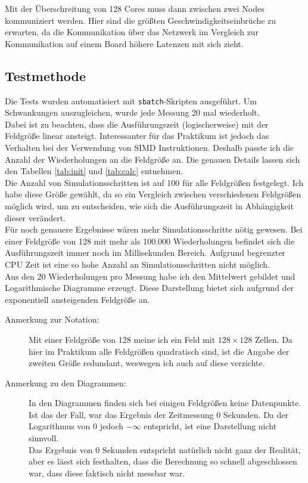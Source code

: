 \documentclass[german,plainarticle,hyperref,utf8]{zihpub}
\begin{document}
	Mit der Überschreitung von 128 Cores muss dann zwischen zwei Nodes kommuniziert werden. Hier sind die größten Geschwindigkeitseinbrüche zu erwarten, da die Kommunikation über das Netzwerk im Vergleich zur Kommunikation auf einem Board höhere Latenzen mit sich zieht.
	\subsection{Testmethode}
	Die Tests wurden automatisiert mit \texttt{sbatch}-Skripten ausgeführt. Um Schwankungen auszugleichen, wurde jede Messung 20 mal wiederholt.\\
	Dabei ist zu beachten, dass die Ausführungszeit (logischerweise) mit der Feldgröße linear ansteigt. Interessanter für das Praktikum ist jedoch das Verhalten bei der Verwendung von SIMD Instruktionen. Deshalb passte ich die Anzahl der Wiederholungen an die Feldgröße an. Die genauen Details lassen sich den Tabellen \ref{tab:init} und \ref{tab:calc} entnehmen.\\
	Die Anzahl von Simulationsschritten ist auf 100 für alle Feldgrößen festgelegt. Ich habe diese Größe gewählt, da so ein Vergleich zwischen verschiedenen Feldgrößen möglich wird, um zu entscheiden, wie sich die Ausführungszeit in Abhängigkeit dieser verändert.\\
	Für noch genauere Ergebnisse wären mehr Simulationsschritte nötig gewesen. Bei einer Feldgröße von 128 mit mehr als 100.000 Wiederholungen befindet sich die Ausführungszeit immer noch im Millisekunden Bereich. Aufgrund begrenzter CPU Zeit ist eine so hohe Anzahl an Simulationsschritten nicht möglich.\\
	
	Aus den 20 Wiederholungen pro Messung habe ich den Mittelwert gebildet und Logarithmische Diagramme erzeugt. Diese Darstellung bietet sich aufgrund der exponentiell ansteigenden Feldgröße an.\\
	
	\begin{description}
		\item[Anmerkung zur Notation:] Mit einer Feldgröße von 128 meine ich ein Feld mit $128\times 128$ Zellen. Da hier im Praktikum alle Feldgrößen quadratisch sind, ist die Angabe der zweiten Größe redundant, weswegen ich auch auf diese verzichte.
		\item[Anmerkung zu den Diagrammen:] In den Diagrammen finden sich bei einigen Feldgrößen keine Datenpunkte. Ist das der Fall, war das Ergebnis der Zeitmessung 0 Sekunden. Da der Logarithmus von 0 jedoch $-\infty$ entspricht, ist eine Darstellung nicht sinnvoll.\\
		Das Ergebnis von 0 Sekunden entspricht natürlich nicht ganz der Realität, aber es lässt sich festhalten, dass die Berechnung so schnell abgeschlossen war, dass diese faktisch nicht messbar war.
	\end{description}
\end{document}
